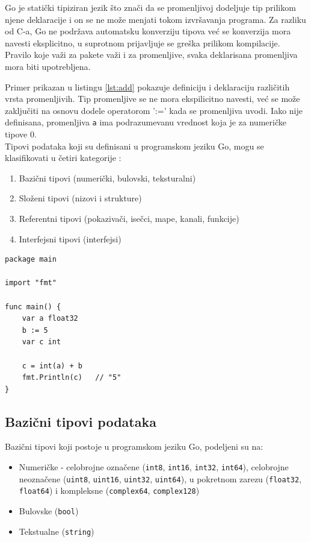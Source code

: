 \documentclass[12pt,oneside]{memoir}
\begin{document}
Go je statički tipiziran jezik što znači da se promenljivoj dodeljuje tip prilikom njene deklaracije i on se ne može menjati tokom izvršavanja programa. Za razliku od C-a, Go ne podržava automatsku konverziju tipova već se konverzija mora navesti eksplicitno, u suprotnom prijavljuje se greška prilikom kompilacije. Pravilo koje važi za pakete važi i za promenljive, svaka deklarisana promenljiva mora biti upotrebljena.

Primer prikazan u listingu \ref{lst:add} pokazuje definiciju i deklaraciju različitih vrsta promenljivih. Tip promenljive se ne mora ekspilicitno navesti, već se može zaključiti na osnovu dodele operatorom ':=' kada se promenljiva uvodi. Iako nije definisana, promenljiva \texttt{a} ima podrazumevanu vrednost koja je za numeričke tipove 0.
\\

Tipovi podataka koji su definisani u programskom jeziku Go, mogu se klasifikovati u četiri kategorije \cite{bookGoProg}: 
\begin{enumerate}
\item Bazični tipovi  (numerički, bulovski, teksturalni)
\item Složeni tipovi (nizovi i strukture)
\item Referentni tipovi (pokazivači, isečci, mape, kanali, funkcije)
\item Interfejsni tipovi (interfejsi)
\end{enumerate}


\begin{center}
\begin{lstlisting}[caption=Primer programa koji ilustruje rad sa promenljivama, label={lst:add},  backgroundcolor=\color{background}]
package main

import "fmt"

func main() {
	var a float32
	b := 5
	var c int

	c = int(a) + b
	fmt.Println(c)	 // "5"
}
\end{lstlisting}
\end{center}


\subsection{Bazični tipovi podataka}

Bazični tipovi koji postoje u programskom jeziku Go, podeljeni su na:
\begin{itemize}

\item Numeričke -  celobrojne označene (\texttt{int8}, \texttt{int16}, \texttt{int32}, \texttt{int64}),
 celobrojne neoznačene  (\texttt{uint8}, \texttt{uint16}, \texttt{uint32}, \texttt{uint64}), u pokretnom zarezu (\texttt{float32}, \texttt{float64}) i kompleksne (\texttt{complex64}, \texttt{complex128})

\item Bulovske  (\texttt{bool})

\item Tekstualne (\texttt{string})

\end{itemize}
\end{document}
